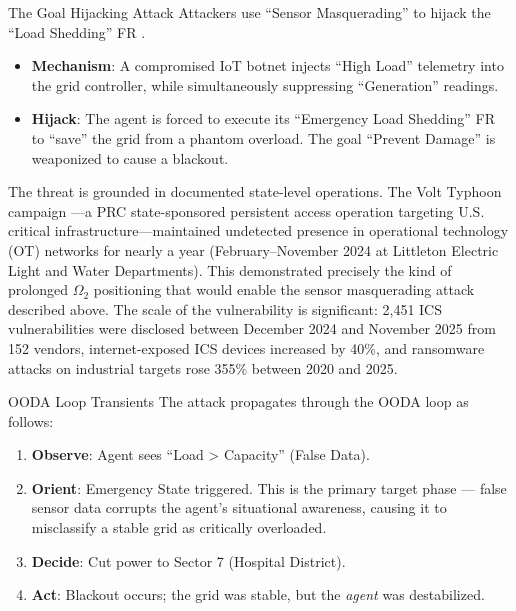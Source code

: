 \documentclass[
  ignorenonframetext,
]{beamer}
\providecommand{\tightlist}{%
  \setlength{\itemsep}{0pt}\setlength{\parskip}{0pt}}
\begin{document}
\begin{frame}[allowframebreaks]{The Goal Hijacking Attack}
\protect{}\label{the-goal-hijacking-attack}
Attackers use ``Sensor Masquerading'' to hijack the ``Load Shedding'' FR
\cite{langner2011stuxnet, liang2017review}.

\begin{itemize}
\tightlist
\item
  \textbf{Mechanism}: A compromised IoT botnet injects ``High Load''
  telemetry into the grid controller, while simultaneously suppressing
  ``Generation'' readings.
\item
  \textbf{Hijack}: The agent is forced to execute its ``Emergency Load
  Shedding'' FR to ``save'' the grid from a phantom overload. The goal
  ``Prevent Damage'' is weaponized to cause a blackout.
\end{itemize}

The threat is grounded in documented state-level operations. The Volt
Typhoon campaign \cite{cisa2024volttyphoon}---a PRC state-sponsored
persistent access operation targeting U.S. critical
infrastructure---maintained undetected presence in operational
technology (OT) networks for nearly a year (February--November 2024 at
Littleton Electric Light and Water Departments). This demonstrated
precisely the kind of prolonged \(\Omega_2\) positioning that would
enable the sensor masquerading attack described above. The scale of the
vulnerability is significant: 2,451 ICS vulnerabilities were disclosed
between December 2024 and November 2025 from 152 vendors,
internet-exposed ICS devices increased by 40\%, and ransomware attacks
on industrial targets rose 355\% between 2020 and 2025.
\end{frame}

\begin{frame}[allowframebreaks]{OODA Loop Transients}
\protect{}\label{ooda-loop-transients}
The attack propagates through the OODA loop \cite{boyd1987patterns} as
follows:

\begin{enumerate}
\tightlist
\item
  \textbf{Observe}: Agent sees ``Load \textgreater{} Capacity'' (False
  Data).
\item
  \textbf{Orient}: Emergency State triggered. This is the primary target
  phase --- false sensor data corrupts the agent's situational
  awareness, causing it to misclassify a stable grid as critically
  overloaded.
\item
  \textbf{Decide}: Cut power to Sector 7 (Hospital District).
\item
  \textbf{Act}: Blackout occurs; the grid was stable, but the
  \emph{agent} was destabilized.
\end{enumerate}
\end{frame}
\end{document}
